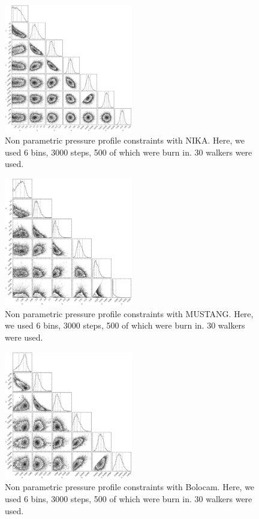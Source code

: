 \documentclass[iop,numberedappendix,apj]{emulateapj}
\begin{document}
\begin{figure}[!h]
  \centering
  \includegraphics[width=0.5\textwidth]{NIKA_ml_deproj_figs/NIKA_Real_6_B_Real_3000S_500B_ML-YES_PP-YES_30W_contour.eps}
  \caption{Non parametric pressure profile constraints with NIKA. Here, we used 6 bins, 3000 steps, 500 of which were
    burn in. 30 walkers were used.}
  \label{fig:nika_contours}
\end{figure}
\begin{figure}[!h]
  \centering
  \includegraphics[width=0.5\textwidth]{NIKA_ml_deproj_figs/MUSTANG_RB_6_B_2500S_500B_ML-NO_30W_contour.eps}
  \caption{Non parametric pressure profile constraints with MUSTANG. Here, we used 6 bins, 3000 steps, 500 of which were
    burn in. 30 walkers were used.}
  \label{fig:mustang_contours}
\end{figure}
\begin{figure}[!h]
  \centering
  \includegraphics[width=0.5\textwidth]{NIKA_ml_deproj_figs/BOLOCAM_Real_6_B_Real_2500S_500B_ML-NO_PP-NO_30W_contour.eps}
  \caption{Non parametric pressure profile constraints with Bolocam. Here, we used 6 bins, 3000 steps, 500 of which were
    burn in. 30 walkers were used.}
  \label{fig:bolocam_contours}
\end{figure}
\end{document}
